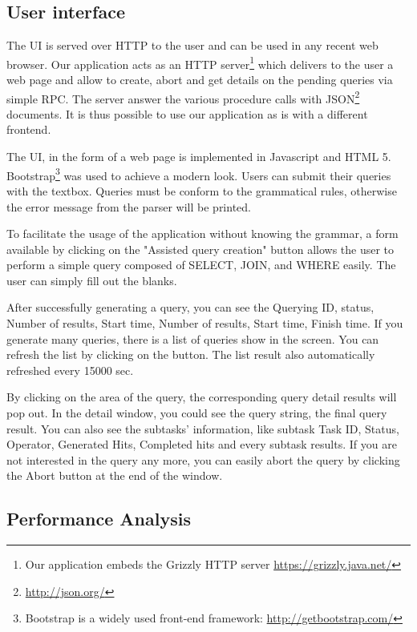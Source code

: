 \documentclass{article}
\begin{document}
\subsection{User interface}

The UI is served over HTTP to the user and can be used in any recent web
browser. Our application acts as an HTTP server\footnote{Our application embeds
the Grizzly HTTP server \url{https://grizzly.java.net/}} which delivers to the
user a web page and allow to create, abort and get details on the pending
queries via simple RPC. The server answer the various procedure calls with
JSON\footnote{\url{http://json.org/}} documents. It is thus possible to use our
application as is with a different frontend.

The UI, in the form of a web page is implemented in  Javascript and HTML 5.
Bootstrap\footnote{Bootstrap is a widely used front-end framework:
\url{http://getbootstrap.com/}} was used to achieve a modern look.
Users can submit their queries with the textbox. Queries must be conform to the
grammatical rules, otherwise the error message from the parser will be printed.

To facilitate the usage of the application without knowing the grammar, a form
available by clicking on the "Assisted query creation" button allows the user
to perform a simple query composed of SELECT, JOIN, and WHERE easily. The user
can simply fill out the blanks.

After successfully generating a query, you can see the Querying ID,  status, Number of results, Start time, Number of results, Start time, Finish time. If you generate many queries, there is a list of queries show in the screen. You can refresh the list by clicking on the button. The list result also automatically refreshed every 15000 sec.

By clicking on the area of the query, the corresponding query detail results will pop out. In the detail window, you could see the query string, the final query result. You can also see the subtasks' information, like subtask Task ID, Status, Operator, Generated Hits, Completed hits and every subtask results. If you are not interested in the query any more, you can easily abort the query by clicking the Abort button at the end of the window.

\subsection{Performance Analysis}
\end{document}
